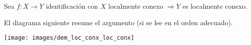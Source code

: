 \begin{prop}
Sea $f : X \rightarrow Y$ identificación con $X$ localmente conexo $\Rightarrow Y$ es localmente conexo.
\end{prop}
\begin{demo}
    El diagrama siguiente resume el argumento (si se lee en el orden adecuado).
    \begin{center}
        \texttt{[image: images/dem\_loc\_conx\_loc\_conx]} 
    \end{center}
\end{demo}
